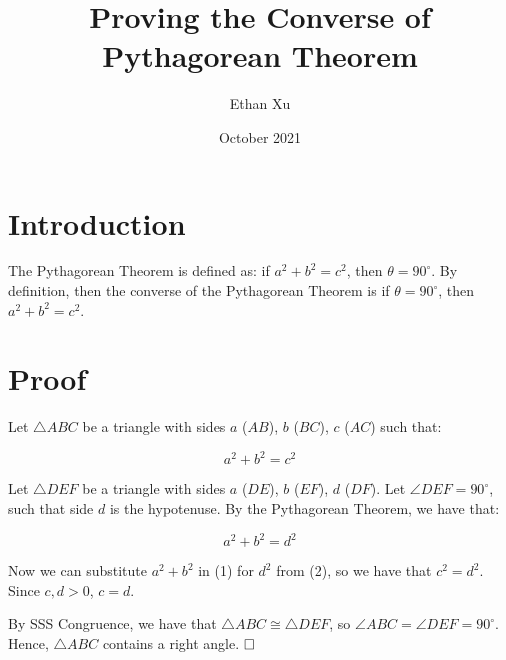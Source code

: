 \documentclass{article}
\title{Proving the Converse of Pythagorean Theorem}
\author{Ethan Xu}
\date{October 2021}
\begin{document}
\maketitle

\section{Introduction}
The Pythagorean Theorem is defined as: if $a^2+b^2=c^2$, then $\theta = 90^{\circ}$. By definition, then the converse of the Pythagorean Theorem is if $\theta = 90^{\circ}$, then $a^2+b^2=c^2$.

\section{Proof}
Let $\bigtriangleup ABC$ be a triangle with sides $a$ ($AB$), $b$ ($BC$), $c$ ($AC$) such that:

\begin{equation}
    a^2+b^2=c^2
\end{equation}

Let $\bigtriangleup DEF$ be a triangle with sides $a$ ($DE$), $b$ ($EF$), $d$ ($DF$). Let $\angle DEF = 90^{\circ}$, such that side $d$ is the hypotenuse. By the Pythagorean Theorem, we have that:

\begin{equation}
    a^2+b^2=d^2
\end{equation}

Now we can substitute $a^2+b^2$ in (1) for $d^2$ from (2), so we have that $c^2=d^2$. Since $c, d > 0$, $c=d$.

By SSS Congruence, we have that $\bigtriangleup ABC \cong \bigtriangleup DEF$, so $\angle ABC = \angle DEF = 90^{\circ}$. Hence, $\bigtriangleup ABC$ contains a right angle. $\hfill\square$
\end{document}
